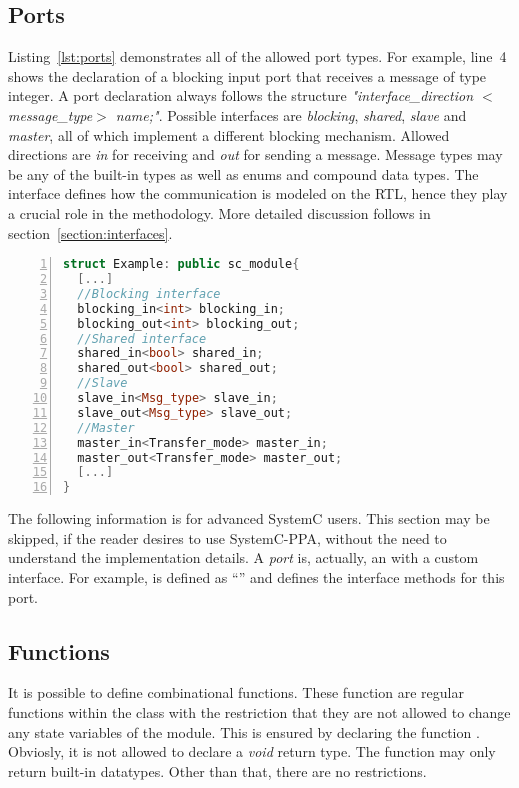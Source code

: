 \subsection{Ports}
\label{section:ports}
Listing~\ref{lst:ports} demonstrates all of the allowed port types. %
For example, line~4 shows the declaration of a blocking input port
that receives a message of type integer. %
A port declaration always follows the structure
\textit{"interface\_direction $<$message\_type$>$ name;"}. %
Possible interfaces are \textit{blocking}, \textit{shared},
\textit{slave} and \textit{master}, all of which implement a different
blocking mechanism. %
Allowed directions are \textit{in} for receiving and \textit{out} for
sending a message. %
Message types may be any of the built-in types as well as enums and
compound data types.  %
The interface defines how the communication is modeled on the RTL,
hence they play a crucial role in the methodology. %
More detailed discussion follows in section~\ref{section:interfaces}. %

\begin{lstlisting}[language=C++,
caption={Example of all port interfaces},
label={lst:ports},
numbers=left,
captionpos=b,  
basicstyle={\footnotesize},
xleftmargin=5.0ex]
struct Example: public sc_module{
  [...]
  //Blocking interface
  blocking_in<int> blocking_in;
  blocking_out<int> blocking_out;
  //Shared interface
  shared_in<bool> shared_in;
  shared_out<bool> shared_out;
  //Slave
  slave_in<Msg_type> slave_in;
  slave_out<Msg_type> slave_out;
  //Master
  master_in<Transfer_mode> master_in;
  master_out<Transfer_mode> master_out;
  [...]
}
\end{lstlisting}

The following information is for advanced SystemC users. %
This section may be skipped, if the reader desires to use SystemC-PPA, without the need to understand the implementation details. %
A \textit{port} is, actually, an  with a custom interface. %
For example,  is defined as ``'' and  defines the
interface methods for this port. %

\subsection{Functions}
\label{section:functions}

It is possible to define combinational functions.
These function are regular functions within the class
with the restriction that they are not allowed to change any state variables of the module.
This is ensured by declaring the function .
Obviosly, it is not allowed to declare a \textit{void} return type.
The function may only return built-in datatypes.
Other than that, there are no restrictions.


